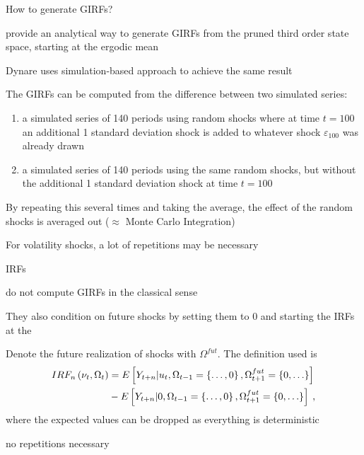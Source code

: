 \begin{frame}{How to generate GIRFs?}
\begin{witemize}
\item \textcite{AndreasenEtal2018} provide an analytical way to generate GIRFs from the pruned third order state space, starting at the ergodic mean
\item Dynare uses simulation-based approach to achieve the same result
\item The GIRFs can be computed from the difference between two simulated series:
\begin{enumerate}
  \item a simulated series of 140 periods using random shocks where at time $t=100$ an additional 1 standard deviation shock is added to whatever shock $\varepsilon_{100}$ was already drawn
  \item a simulated series of 140 periods using the same random shocks, but without the additional 1 standard deviation shock at time $t=100$
\end{enumerate}
\item By repeating this several times and taking the average, the effect of the random shocks is averaged out ($\approx$ Monte Carlo Integration)
\item For volatility shocks, a lot of repetitions may be necessary
\end{witemize}
\end{frame}

\begin{frame}{\textcite{FVetal2011AER} IRFs}
\begin{witemize}
\item \textcite{FVetal2011AER} do not compute GIRFs in the classical sense
\item They also condition on future shocks by setting them to 0 and starting the IRFs at the 
\item Denote the future realization of shocks with $\Omega^{fut}$. The definition used is
 \begin{align}
  IR{F_n}\left( {{\nu _t},{\Omega _t}} \right) &= E\left[ {{Y_{t + n}}|{u_t},{\Omega _{t - 1}} = \left\{ { \ldots ,0} \right\},\Omega _{t + 1}^{fut} = \left\{ {0, \ldots } \right\}} \right] \notag \\
   &- E\left[ {{Y_{t + n}}|0,{\Omega _{t - 1}} = \left\{ { \ldots ,0} \right\},\Omega _{t + 1}^{fut} = \left\{ {0, \ldots } \right\}} \right]  \label{eq:FV_IRF} \: ,
\end{align}
where the expected values can be dropped as everything is deterministic
\item[$\rightarrow$] no repetitions necessary
\end{witemize}
\end{frame}

